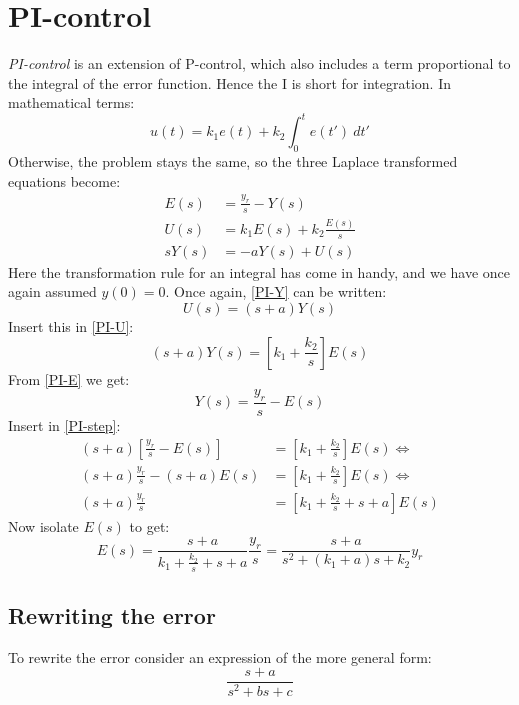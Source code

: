 \documentclass[12pt, a4paper]{article}
\numberwithin{equation}{section}
\begin{document}
\section{PI-control}
\emph{PI-control} is an extension of P-control, which also includes a term proportional to the integral of the error function. Hence the I is short for integration. In mathematical terms:
\begin{equation}
u(t)=k_1e(t)+k_2\int_0^t e(t')\ dt'
\end{equation}
Otherwise, the problem stays the same, so the three Laplace transformed equations become:
\begin{align}
E(s)&=\frac{y_r}{s}-Y(s)\label{PI-E}\\
U(s)&=k_1 E(s)+k_2\frac{E(s)}{s}\label{PI-U}\\
s Y(s)&=-a Y(s)+U(s)\label{PI-Y}
\end{align}
Here the transformation rule for an integral has come in handy, and we have once again assumed $y(0)=0$. Once again, \ref{PI-Y} can be written:
\begin{equation}
U(s)=(s+a)Y(s)
\end{equation}
Insert this in \ref{PI-U}:
\begin{equation}
(s+a)Y(s)=\left[k_1+\frac{k_2}{s}\right]E(s)\label{PI-step}
\end{equation}
From \ref{PI-E} we get:
\begin{equation}
Y(s)=\frac{y_r}{s}-E(s)
\end{equation}
Insert in \ref{PI-step}:
\begin{align}
(s+a)\left[\frac{y_r}{s}-E(s)\right]&=\left[k_1+\frac{k_2}{s}\right]E(s)\Leftrightarrow\\
(s+a)\frac{y_r}{s}-(s+a)E(s)&=\left[k_1+\frac{k_2}{s}\right]E(s)\Leftrightarrow\\
(s+a)\frac{y_r}{s}&=\left[k_1+\frac{k_2}{s}+s+a\right]E(s)
\end{align}
Now isolate $E(s)$ to get:
\begin{equation}
E(s)=\frac{s+a}{k_1+\frac{k_2}{s}+s+a}\frac{y_r}{s}=\frac{s+a}{s^2+(k_1+a)s+k_2}y_r\label{PI_error}
\end{equation}

\subsection{Rewriting the error}
To rewrite the error consider an expression of the more general form:
\begin{equation}
\frac{s+a}{s^2+bs+c}
\end{equation}
\end{document}
